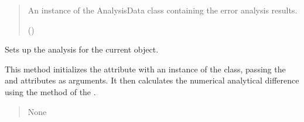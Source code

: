 \documentclass[a4paper,11pt,english,openany]{sphinxmanual}
\begin{document}
\begin{fulllineitems}
\begin{fulllineitems}
\begin{quote}
\begin{description}
\begin{itemize}
\end{itemize}

\sphinxAtStartPar
An instance of the AnalysisData class containing the error analysis results.

\sphinxAtStartPar
{\hyperref[\detokenize{api/spyice.postprocess.analysis:spyice.postprocess.analysis.AnalysisData}]{}} ()

\end{description}\end{quote}

\end{fulllineitems}


\begin{fulllineitems}
\label{\detokenize{api/spyice.postprocess.analysis:spyice.postprocess.analysis.Analysis.set_analysis}}
\pysigstartsignatures
{}
\pysigstopsignatures
\sphinxAtStartPar
Sets up the analysis for the current object.

\sphinxAtStartPar
This method initializes the  attribute with an instance of the  class,
passing the  and  attributes as arguments. It then calculates the numerical
analytical difference using the  method of the .
\begin{quote}\begin{description}
\sphinxAtStartPar
{}

\sphinxAtStartPar
None

\end{description}\end{quote}

\end{fulllineitems}



\end{fulllineitems}
\end{document}
